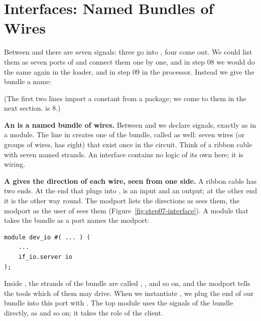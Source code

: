 \section{Interfaces: Named Bundles of Wires}
\label{sec:step07-interface}

Between  and  there are seven signals: three go into
, four come out. We could list them as seven ports of 
and connect them one by one, and in step 08 we would do the same again in
the loader, and in step 09 in the processor. Instead we give the bundle a
name:


(The first two lines import a constant from a package; we come to them in the
next section.  is 8.)

\textbf{An  is a named bundle of wires.} Between
 and  we declare signals, exactly as in
a module. The line  in  creates one
 of the bundle, called  as well: seven wires (or
groups of wires,  has eight) that exist once in the circuit.
Think of a ribbon cable with seven named strands. An interface contains no
logic of its own here; it is wiring.

\textbf{A  gives the direction of each wire, seen from one side.}
A ribbon cable has two ends. At the end that plugs into ,
 is an input and  an output; at the other end it is
the other way round. The modport  lists the directions as
 sees them, the modport  as the user of 
sees them (Figure~\ref{fig:step07-interface}). A module that takes the bundle
as a port names the modport:
\begin{lstlisting}
module dev_io #( ... ) (
    ...
    if_io.server io
);
\end{lstlisting}
Inside , the strands of the bundle are called ,
, and so on, and the modport tells the tools which of them
 may drive. When we instantiate , we plug the
 end of our bundle into this port with .
The top module  uses the signals of the bundle directly, as
 and so on; it takes the role of the client.


